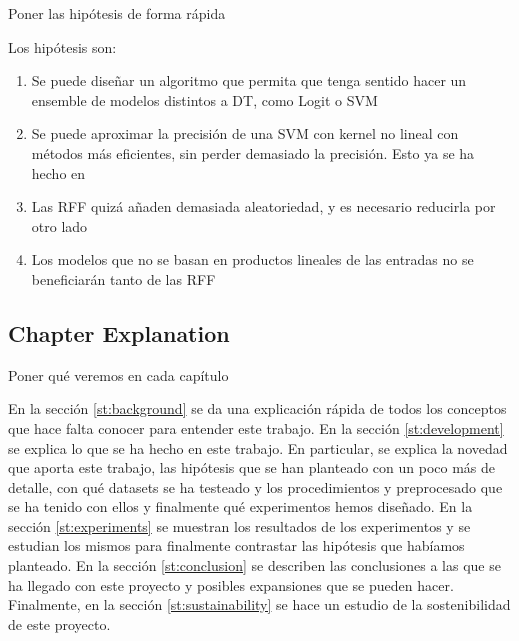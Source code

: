   Poner las hipótesis de forma rápida

  \begin{note}
    Los hipótesis son:
    \begin{enumerate}
      \item Se puede diseñar un algoritmo que permita que tenga sentido hacer
      un ensemble de modelos distintos a DT, como Logit o SVM
      \item Se puede aproximar la precisión de una SVM con kernel no lineal con
      métodos más eficientes, sin perder demasiado la precisión. Esto ya se ha
      hecho en \cite{svm_rff}
      \item Las RFF quizá añaden demasiada aleatoriedad, y es necesario
      reducirla por otro lado
      \item Los modelos que no se basan en productos lineales de las entradas
      no se beneficiarán tanto de las RFF
    \end{enumerate}
  \end{note}
\subsection*{Chapter Explanation}
  Poner qué veremos en cada capítulo

  \begin{note}
    En la sección \ref{st:background} se da una explicación rápida de todos los
    conceptos que hace falta conocer para entender este trabajo. En la
    sección \ref{st:development} se explica lo que se ha hecho en este trabajo.
    En particular, se explica la novedad que aporta este trabajo, las hipótesis
    que se han planteado con un poco más de detalle, con qué datasets se ha
    testeado y los procedimientos y preprocesado que se ha tenido con ellos
    y finalmente qué experimentos hemos diseñado. En la sección
    \ref{st:experiments} se muestran los resultados de los experimentos y se
    estudian los mismos para finalmente contrastar las hipótesis que habíamos
    planteado. En la sección \ref{st:conclusion} se describen las conclusiones
    a las que se ha llegado con este proyecto y posibles expansiones que se
    pueden hacer. Finalmente, en la sección \ref{st:sustainability} se hace un
    estudio de la sostenibilidad de este proyecto.
  \end{note}
